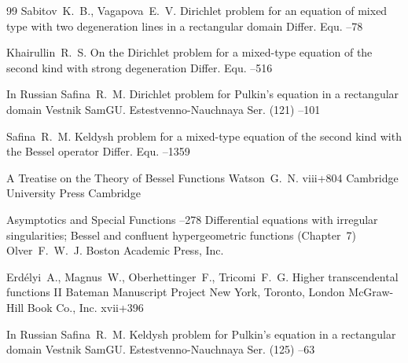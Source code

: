 \begin{thebibliography}{99}
\by Sabitov~K.~B., Vagapova~E.~V.
\paper Dirichlet problem for an equation of mixed type with two degeneration lines in a rectangular domain
\jour Differ. Equ. 
--78 

\by Khairullin~R.~S.
\paper On the Dirichlet problem for a mixed-type equation of the second kind with strong degeneration
\jour Differ. Equ.
--516 

\lang In Russian
\by Safina~R.~M.
\paper Dirichlet problem for Pulkin's equation in a rectangular domain
\jour Vestnik SamGU. Estestvenno-Nauchnaya Ser.
(121)
--101

\by Safina~R.~M.
\paper Keldysh problem for a mixed-type equation of the second kind with the Bessel operator
\jour Differ. Equ. 
--1359 



\book A Treatise on the Theory of Bessel Functions
\by  Watson~G.~N.
\totalpages viii+804
\publ Cambridge University Press
\publaddr Cambridge 


\inbook Asymptotics and Special Functions
–278
\paper Differential equations with irregular singularities; Bessel and confluent hypergeometric functions (Chapter~7)
\by  Olver~F.~W.~J.
\publaddr Boston
\publ Academic Press, Inc.


\by Erd\'elyi~A., Magnus~W., Oberhettinger~F., Tricomi~F.~G.
\book Higher transcendental functions
\bookvol II
\serial Bateman Manuscript Project
\publaddr New York, Toronto, London
\publ McGraw-Hill Book Co., Inc.
\totalpages xvii+396 

\lang In Russian
\by Safina~R.~M.
\paper Keldysh problem for Pulkin's equation in a rectangular domain
\jour Vestnik SamGU. Estestvenno-Nauchnaya Ser.
(125)
--63

\end{thebibliography}


\renewcommand{\baselinestretch}{0.9}

\newpage

%
